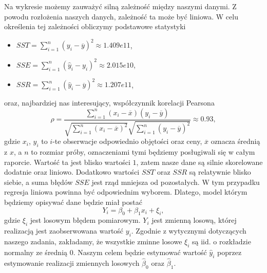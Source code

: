 \documentclass[12pt]{article}
\theoremstyle{exer}
\begin{document}
	\noindent Na wykresie możemy zauważyć silną zależność między naszymi danymi. Z powodu rozłożenia naszych danych, zależność ta może być liniowa. W celu określenia tej zależności obliczymy podstawowe statystyki
	\begin{itemize}
		\item $SST=\sum_{i=1}^n(y_i-\overline{y})^2\approx1.409e11$,
		\item $SSE=\sum_{i=1}^n(\hat y_i-y_i)^2\approx2.015e10$,
		\item $SSR=\sum_{i=1}^n(\hat y_i-\overline{y})^2\approx1.207e11$,
	\end{itemize}
	oraz, najbardziej nas interesujący, współczynnik korelacji Pearsona
	\begin{equation}
		\rho=\frac{\sum_{i=1}^n\left(x_i-\overline{x}\right)\left(y_i-\overline{y}\right)}
		{\sqrt{\sum_{i=1}^n\left(x_i-\overline{x}\right)^2}\sqrt{\sum_{i=1}^n\left(y_i-\overline{y}\right)^2}}\approx0.93,
	\end{equation}
	gdzie $x_i$, $y_i$ to $i$-te obserwacje odpowiednio objętości oraz ceny, $\overline{x}$ oznacza średnią z $x$, a $n$ to rozmiar próby, oznaczeniami tymi będziemy posługiwali się w całym raporcie. Wartość ta jest blisko wartości $1$, zatem nasze dane są silnie skorelowane dodatnie oraz liniowo. Dodatkowo wartości $SST$ oraz $SSR$ są relatywnie blisko siebie, a suma błędów $SSE$ jest rząd mniejsza od pozostałych. W tym przypadku regresja liniowa powinna być odpowiednim wyborem. Dlatego, model którym będziemy opisywać dane będzie miał postać
	\begin{equation}\label{eq:reg}
		Y_i=\beta_0+\beta_1x_i+\xi_i,
	\end{equation}
	gdzie $\xi_i$ jest losowym błędem pomiarowym. $Y_i$ jest zmienną losową, której realizacją jest zaobserwowana wartość $y_i$. Zgodnie z wytycznymi dotyczących naszego zadania, zakładamy, że wszystkie zminne losowe $\xi_i$ są iid. o rozkładzie normalny ze średnią 0. Naszym celem będzie estymować wartość $\hat y_i$ poprzez estymowanie realizacji zmiennych losowych $\hat \beta_0$ oraz $\hat\beta_1$.
\end{document}

